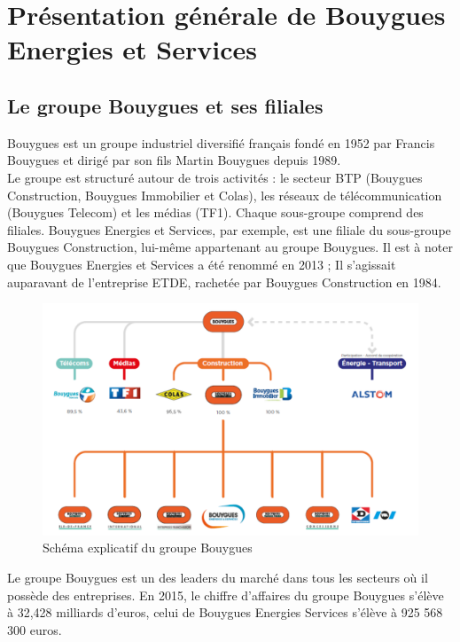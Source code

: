 \documentclass[a4paper]{article}
\begin{document}
    \newpage 
    \section{Présentation générale de Bouygues Energies et Services}

    \subsection{Le groupe Bouygues et ses filiales}

    Bouygues est un groupe industriel diversifié français fondé en 1952 par Francis Bouygues et dirigé par son fils Martin Bouygues depuis 1989. \\

    Le groupe est structuré autour de trois activités : le secteur BTP (Bouygues Construction,
Bouygues Immobilier et Colas), les réseaux de télécommunication (Bouygues Telecom) et les médias (TF1). Chaque sous-groupe comprend des filiales. Bouygues Energies et Services, par exemple, est une filiale du sous-groupe Bouygues Construction, lui-même appartenant au groupe Bouygues. Il est à noter que Bouygues Energies et Services a été renommé en 2013 ; Il s'agissait auparavant de l'entreprise ETDE, rachetée par Bouygues Construction en 1984. \\

    \begin{figure}[H]
    \includegraphics[scale=0.45]{img/groupeBouygues}
    \caption{Schéma explicatif du groupe Bouygues}
    \end{figure}

    \vfill

    Le groupe Bouygues est un des leaders du marché dans tous les secteurs où il possède des entreprises. En 2015, le chiffre d’affaires du groupe Bouygues s’élève à 32,428 milliards d’euros, celui de Bouygues Energies Services s'élève à 925 568 300 euros. \\
\end{document}
